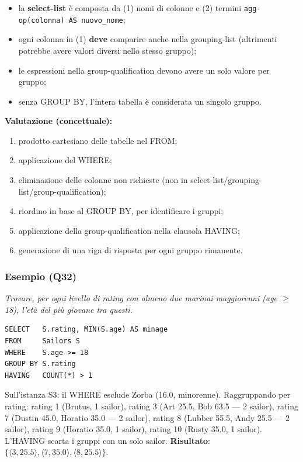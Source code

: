 \documentclass[12pt, a4paper]{article}
\begin{document}
\begin{itemize}
    \item la \textbf{select-list} è composta da (1) nomi di colonne e (2) termini \texttt{agg-op(colonna) AS nuovo\_nome};
    \item ogni colonna in (1) \textbf{deve} comparire anche nella grouping-list (altrimenti potrebbe avere valori diversi nello stesso gruppo);
    \item le espressioni nella group-qualification devono avere un solo valore per gruppo;
    \item senza GROUP BY, l'intera tabella è considerata un singolo gruppo.
\end{itemize}

\textbf{Valutazione (concettuale):}
\begin{enumerate}
    \item prodotto cartesiano delle tabelle nel FROM;
    \item applicazione del WHERE;
    \item eliminazione delle colonne non richieste (non in select-list/grouping-list/group-qualification);
    \item riordino in base al GROUP BY, per identificare i gruppi;
    \item applicazione della group-qualification nella clausola HAVING;
    \item generazione di una riga di risposta per ogni gruppo rimanente.
\end{enumerate}

\subsubsection{Esempio (Q32)}
\textit{Trovare, per ogni livello di rating con almeno due marinai maggiorenni (age $\geq$ 18), l'età del più giovane tra questi.}
\begin{verbatim}
SELECT   S.rating, MIN(S.age) AS minage
FROM     Sailors S
WHERE    S.age >= 18
GROUP BY S.rating
HAVING   COUNT(*) > 1
\end{verbatim}
Sull'istanza S3: il WHERE esclude Zorba (16.0, minorenne). Raggruppando per rating: rating 1 (Brutus, 1 sailor), rating 3 (Art 25.5, Bob 63.5 — 2 sailor), rating 7 (Dustin 45.0, Horatio 35.0 — 2 sailor), rating 8 (Lubber 55.5, Andy 25.5 — 2 sailor), rating 9 (Horatio 35.0, 1 sailor), rating 10 (Rusty 35.0, 1 sailor). L'HAVING scarta i gruppi con un solo sailor. \textbf{Risultato}: $\{\langle 3,25.5\rangle, \langle 7,35.0\rangle, \langle 8,25.5\rangle\}$.
\end{document}
